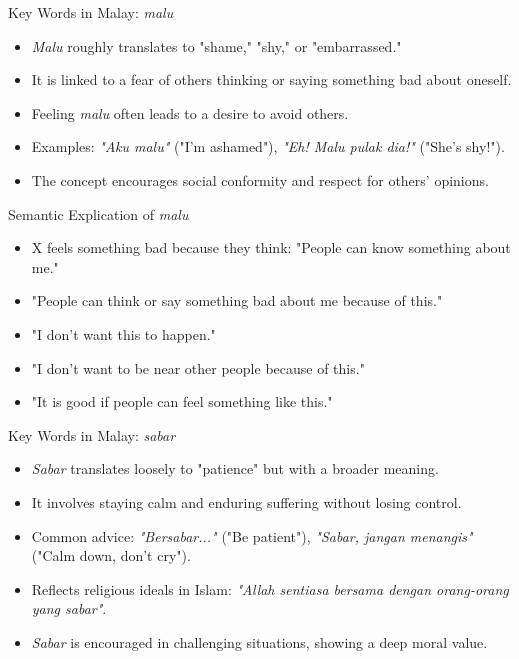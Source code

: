 \documentclass{beamer}
\begin{document}
\begin{frame}{Key Words in Malay: \textit{malu}}
    \begin{itemize}
        \item \textit{Malu} roughly translates to "shame," "shy," or "embarrassed."
        \item It is linked to a fear of others thinking or saying something bad about oneself.
        \item Feeling \textit{malu} often leads to a desire to avoid others.
        \item Examples: \textit{"Aku malu"} ("I’m ashamed"), \textit{"Eh! Malu pulak dia!"} ("She’s shy!").
        \item The concept encourages social conformity and respect for others’ opinions.
    \end{itemize}
\end{frame}

\begin{frame}{Semantic Explication of \textit{malu}}
    \begin{itemize}
        \item X feels something bad because they think: "People can know something about me."
        \item "People can think or say something bad about me because of this."
        \item "I don’t want this to happen."
        \item "I don’t want to be near other people because of this."
        \item "It is good if people can feel something like this."
    \end{itemize}
\end{frame}

\begin{frame}{Key Words in Malay: \textit{sabar}}
    \begin{itemize}
        \item \textit{Sabar} translates loosely to "patience" but with a broader meaning.
        \item It involves staying calm and enduring suffering without losing control.
        \item Common advice: \textit{"Bersabar..."} ("Be patient"), \textit{"Sabar, jangan menangis"} ("Calm down, don’t cry").
        \item Reflects religious ideals in Islam: \textit{"Allah sentiasa bersama dengan orang-orang yang sabar"}.
        \item \textit{Sabar} is encouraged in challenging situations, showing a deep moral value.
    \end{itemize}
\end{frame}
\end{document}
